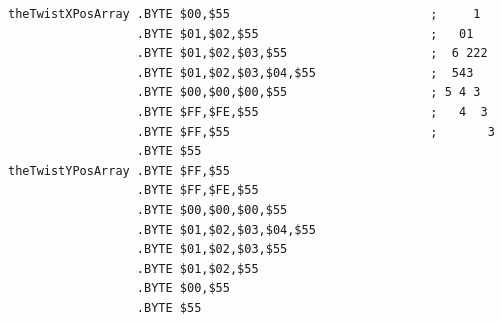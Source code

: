 \begin{lstlisting}
theTwistXPosArray .BYTE $00,$55                            ;     1  
                  .BYTE $01,$02,$55                        ;   01   
                  .BYTE $01,$02,$03,$55                    ;  6 222 
                  .BYTE $01,$02,$03,$04,$55                ;  543   
                  .BYTE $00,$00,$00,$55                    ; 5 4 3  
                  .BYTE $FF,$FE,$55                        ;   4  3 
                  .BYTE $FF,$55                            ;       3
                  .BYTE $55
theTwistYPosArray .BYTE $FF,$55
                  .BYTE $FF,$FE,$55
                  .BYTE $00,$00,$00,$55
                  .BYTE $01,$02,$03,$04,$55
                  .BYTE $01,$02,$03,$55
                  .BYTE $01,$02,$55
                  .BYTE $00,$55
                  .BYTE $55
\end{lstlisting}


